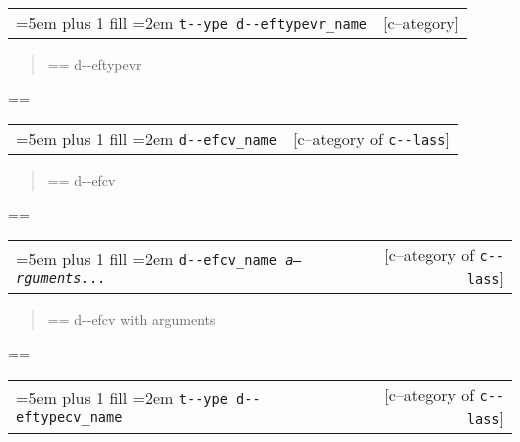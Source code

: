\documentclass{book}
\makeatletter
\newenvironment{GNUTexinfopreformatted}{%
  \par\GNUTobeylines\obeyspaces\frenchspacing
  \parskip=\z@\parindent=\z@}{}
{\catcode`\^^M=13 \gdef\GNUTobeylines{\catcode`\^^M=13 \def^^M{\null\par}}}
\newenvironment{GNUTexinfoindented}
  {\begin{list}{}{}
  \item\relax}
  {\end{list}}
\makeatother
\begin{document}
\begin{GNUTexinfoindented}
\noindent\begin{tabularx}{\linewidth}{@{}Xr}
\rightskip=5em plus 1 fill
\hangindent=2em
\texttt{t{-}{-}ype d{-}{-}eftypevr\_name}& [c--ategory]
\end{tabularx}

%
\begin{quote}
\unskip{\parskip=0pt\noindent}%
\begin{GNUTexinfopreformatted}%
\ttfamily d{-}{-}eftypevr
\end{GNUTexinfopreformatted}
\end{quote}
\begin{GNUTexinfopreformatted}%
\ttfamily 
\end{GNUTexinfopreformatted}

\noindent\begin{tabularx}{\linewidth}{@{}Xr}
\rightskip=5em plus 1 fill
\hangindent=2em
\texttt{d{-}{-}efcv\_name}& [c--ategory of \texttt{c{-}{-}lass}]
\end{tabularx}

%
\begin{quote}
\unskip{\parskip=0pt\noindent}%
\begin{GNUTexinfopreformatted}%
\ttfamily d{-}{-}efcv
\end{GNUTexinfopreformatted}
\end{quote}
\begin{GNUTexinfopreformatted}%
\ttfamily 
\end{GNUTexinfopreformatted}

\noindent\begin{tabularx}{\linewidth}{@{}Xr}
\rightskip=5em plus 1 fill
\hangindent=2em
\texttt{d{-}{-}efcv\_name \EmbracOn{}\textnormal{\textsl{a--rguments...}}\EmbracOff{}}& [c--ategory of \texttt{c{-}{-}lass}]
\end{tabularx}

%
\begin{quote}
\unskip{\parskip=0pt\noindent}%
\begin{GNUTexinfopreformatted}%
\ttfamily d{-}{-}efcv with arguments
\end{GNUTexinfopreformatted}
\end{quote}
\begin{GNUTexinfopreformatted}%
\ttfamily 
\end{GNUTexinfopreformatted}

\noindent\begin{tabularx}{\linewidth}{@{}Xr}
\rightskip=5em plus 1 fill
\hangindent=2em
\texttt{t{-}{-}ype d{-}{-}eftypecv\_name}& [c--ategory of \texttt{c{-}{-}lass}]
\end{tabularx}


\end{GNUTexinfoindented}
\end{document}
